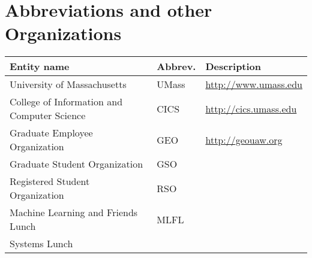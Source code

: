 \section{Abbreviations and other Organizations}
\begin{tabular}{|l l p{5in}|}
  \hline
  Entity name & Abbrev. & Description\\
  \hline
  University of Massachusetts & UMass & \url{http://www.umass.edu}\\
  College of Information and Computer Science & CICS & \url{http://cics.umass.edu}\\
  Graduate Employee Organization & GEO & \url{http://geouaw.org}\\
  Graduate Student Organization & GSO & \\
  Registered Student Organization & RSO & \\
  Machine Learning and Friends Lunch & MLFL &\\
  Systems Lunch & &
\end{tabular}
